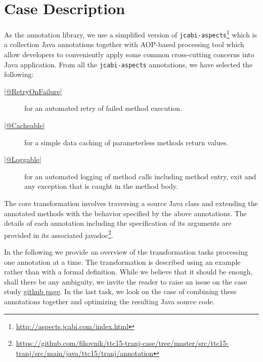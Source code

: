 
\section{Case Description}
\label{sec:Description}

As the annotation library, we use a simplified version of \texttt{jcabi-aspects}\footnote{\url{http://aspects.jcabi.com/index.html}} which is a collection Java annotations together with AOP-based processing tool which allow developers to conveniently apply some common cross-cutting concerns into Java application.
From all the \texttt{jcabi-aspects} annotations, we have selected the following:
%
\begin{description}
  \item[\href{https://github.com/fikovnik/ttc15-tranj-case/blob/master/src/ttc15-tranj/src/main/java/ttc15/tranj/annotation/RetryOnFailure.java}{\javainline|@RetryOnFailure|}] for an automated retry of failed method execution.
  \item[\href{https://github.com/fikovnik/ttc15-tranj-case/blob/master/src/ttc15-tranj/src/main/java/ttc15/tranj/annotation/Cacheable.java}{\javainline|@Cacheable|}] for a simple data caching of parameterless methods return values.
  \item[\href{https://github.com/fikovnik/ttc15-tranj-case/blob/master/src/ttc15-tranj/src/main/java/ttc15/tranj/annotation/Loggable.java}{\javainline|@Loggable|}] for an automated logging of method calls including method entry, exit and any exception that is caught in the method body.
\end{description}

The core transformation involves traversing a source Java class and extending the annotated methods with the behavior specified by the above annotations.
The details of each annotation including the specification of its arguments are provided in its associated javadoc\footnote{\url{https://github.com/fikovnik/ttc15-tranj-case/tree/master/src/ttc15-tranj/src/main/java/ttc15/tranj/annotation}}.

In the following we provide an overview of the transformation tasks processing one annotation at a time.
The transformation is described using an example rather than with a formal definition.
While we believe that it should be enough, shall there be any ambiguity, we invite the reader to raise an issue on the case study \href{https://github.com/fikovnik/ttc15-tranj-case}{github page}.
In the last task, we look on the case of combining these annotations together and optimizing the resulting Java source code.

